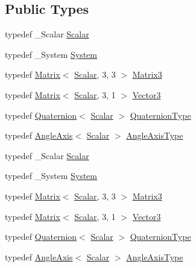\subsection*{Public Types}
\begin{DoxyCompactItemize}
\item 
typedef \+\_\+\+Scalar \hyperlink{class_eigen_1_1_euler_angles_a2ab1d433ac9683268446f8905ac31aac}{Scalar}
\item 
typedef \+\_\+\+System \hyperlink{class_eigen_1_1_euler_angles_a17e3dee5fef4af35bbb4e319c2cdc3c1}{System}
\item 
typedef \hyperlink{group___core___module_class_eigen_1_1_matrix}{Matrix}$<$ \hyperlink{class_eigen_1_1_euler_angles_a2ab1d433ac9683268446f8905ac31aac}{Scalar}, 3, 3 $>$ \hyperlink{class_eigen_1_1_euler_angles_ad0f0ee8240849b0f7d028695849cdbad}{Matrix3}
\item 
typedef \hyperlink{group___core___module_class_eigen_1_1_matrix}{Matrix}$<$ \hyperlink{class_eigen_1_1_euler_angles_a2ab1d433ac9683268446f8905ac31aac}{Scalar}, 3, 1 $>$ \hyperlink{class_eigen_1_1_euler_angles_af0f446aa0f46b3439abedff63fabf39c}{Vector3}
\item 
typedef \hyperlink{group___geometry___module_class_eigen_1_1_quaternion}{Quaternion}$<$ \hyperlink{class_eigen_1_1_euler_angles_a2ab1d433ac9683268446f8905ac31aac}{Scalar} $>$ \hyperlink{class_eigen_1_1_euler_angles_adf351608cad15e660279f7323e516d3a}{Quaternion\+Type}
\item 
typedef \hyperlink{group___geometry___module_class_eigen_1_1_angle_axis}{Angle\+Axis}$<$ \hyperlink{class_eigen_1_1_euler_angles_a2ab1d433ac9683268446f8905ac31aac}{Scalar} $>$ \hyperlink{class_eigen_1_1_euler_angles_a0bc2416b52b29a213eccad8a43ce61a6}{Angle\+Axis\+Type}
\item 
typedef \+\_\+\+Scalar \hyperlink{class_eigen_1_1_euler_angles_a2ab1d433ac9683268446f8905ac31aac}{Scalar}
\item 
typedef \+\_\+\+System \hyperlink{class_eigen_1_1_euler_angles_a17e3dee5fef4af35bbb4e319c2cdc3c1}{System}
\item 
typedef \hyperlink{group___core___module_class_eigen_1_1_matrix}{Matrix}$<$ \hyperlink{class_eigen_1_1_euler_angles_a2ab1d433ac9683268446f8905ac31aac}{Scalar}, 3, 3 $>$ \hyperlink{class_eigen_1_1_euler_angles_ad0f0ee8240849b0f7d028695849cdbad}{Matrix3}
\item 
typedef \hyperlink{group___core___module_class_eigen_1_1_matrix}{Matrix}$<$ \hyperlink{class_eigen_1_1_euler_angles_a2ab1d433ac9683268446f8905ac31aac}{Scalar}, 3, 1 $>$ \hyperlink{class_eigen_1_1_euler_angles_af0f446aa0f46b3439abedff63fabf39c}{Vector3}
\item 
typedef \hyperlink{group___geometry___module_class_eigen_1_1_quaternion}{Quaternion}$<$ \hyperlink{class_eigen_1_1_euler_angles_a2ab1d433ac9683268446f8905ac31aac}{Scalar} $>$ \hyperlink{class_eigen_1_1_euler_angles_adf351608cad15e660279f7323e516d3a}{Quaternion\+Type}
\item 
typedef \hyperlink{group___geometry___module_class_eigen_1_1_angle_axis}{Angle\+Axis}$<$ \hyperlink{class_eigen_1_1_euler_angles_a2ab1d433ac9683268446f8905ac31aac}{Scalar} $>$ \hyperlink{class_eigen_1_1_euler_angles_a0bc2416b52b29a213eccad8a43ce61a6}{Angle\+Axis\+Type}
\end{DoxyCompactItemize}
